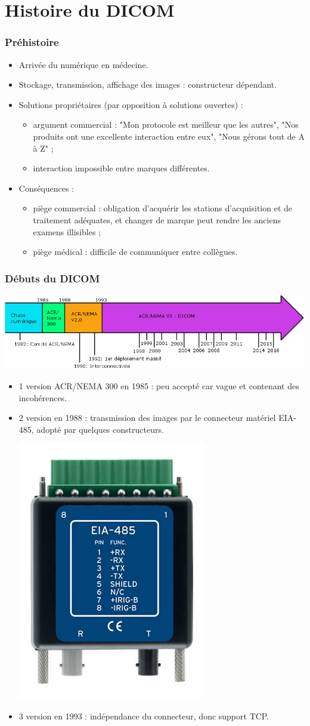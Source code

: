 \section{Histoire du DICOM}

	\frame
	{
		\frametitle{Pr\'ehistoire}
		
		\begin{itemize}
			\item Arriv\'ee du num\'erique en m\'edecine.
			\item Stockage, transmission, affichage des images : constructeur d\'ependant.
			\item Solutions propri\'etaires (par opposition \`a solutions ouvertes) :
			\begin{itemize}
				\item argument commercial : "Mon protocole est meilleur que les autres", "Nos produits ont une excellente interaction entre eux", "Nous g\'erons tout de A \`a Z" ;
				\item interaction impossible entre marques diff\'erentes.
			\end{itemize} 
			\item Cons\'equences :
			\begin{itemize}
				\item pi\`ege commercial : obligation d'acqu\'erir les stations d'acquisition et de traitement ad\'equates, et changer de marque peut rendre les anciens examens illisibles ;
				\item pi\`ege m\'edical : difficile de communiquer entre coll\`egues.
			\end{itemize}
		\end{itemize}
	}
					
	\frame
	{
		\frametitle{D\'ebuts du DICOM}
		\includegraphics[width=\linewidth]{./figures/chrono-dicom.png}

		\begin{itemize}
			\item 1 version ACR/NEMA 300 en 1985 : peu accept\'e car vague et contenant des incoh\'erences.
			\item 2 version en 1988 : transmission des images par le connecteur mat\'eriel EIA-485, adopt\'e par quelques constructeurs.

		        \includegraphics[width=.15\linewidth]{./figures/eia-485.png}
			\item 3 version en 1993 : ind\'ependance du connecteur, donc support TCP.
		\end{itemize}
	}
	
